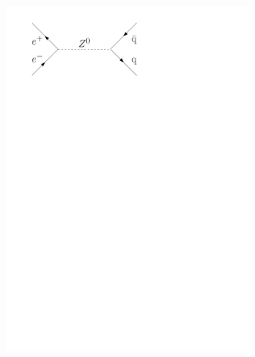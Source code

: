 \documentclass[11pt, a4paper]{article}
\numberwithin{equation}{section}
\begin{document}
\begin{figure}[htb]
\begin{subfigure}{.32\textwidth}
		\includegraphics[width=.9\textwidth]{./figures/theory/feynman/qq}
	\end{subfigure}
	\begin{subfigure}{.32\textwidth}
		\centering

\end{subfigure}
\end{figure}
\end{document}

